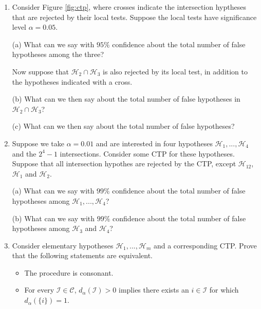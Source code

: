 \documentclass[11pt]{article}
\theoremstyle{plain}
\theoremstyle{definition}
\newcommand{\I}{\mathcal{I}}
\newcommand{\C}{\mathcal{C}}
\newcommand{\Hy}{\mathcal{H}}
\begin{document}
\begin{enumerate}



\item Consider Figure \ref{fig:ctp}, where crosses indicate the intersection hyptheses that are rejected by their local tests. Suppose the local tests have significance level $\alpha=0.05$.

 (a) What can we  say with $95\%$ confidence about the total number of false hypotheses among the three?

Now suppose that $\Hy_2\cap\Hy_3$ is also  rejected by its local test, in addition to the hypotheses indicated with a cross.

(b) What can we then say about the total number of false hypotheses in $\Hy_2\cap\Hy_3$?

(c) What can we then say about the total number of false hypotheses?

\item
Suppose we take $\alpha=0.01$ and are interested in four hypotheses $\Hy_1,...,\Hy_4$ and the $2^4-1$ intersections. Consider some CTP for these hypotheses. Suppose that all intersection hypothes are rejected by the CTP, except $\Hy_{12}$, $\Hy_1$ and $\Hy_2$.

(a) What can we say with $99\%$ confidence about the total number of false hypotheses among $\Hy_1,...,\Hy_4$? 

(b) What can we say with $99\%$ confidence about the total number of false hypotheses among $\Hy_3$ and $\Hy_4$?



\item 
Consider elementary hypotheses $\Hy_1,...,\Hy_m$ and a corresponding CTP. Prove that the following statements are equivalent.
\begin{itemize}
\item The procedure is consonant.
\item For every $\I\in\C$, $d_{\alpha}(\I)>0$ implies there exists an $i\in\I$ for which $d_{\alpha}(\{i\})=1$.
\end{itemize}







\end{enumerate}
\end{document}
